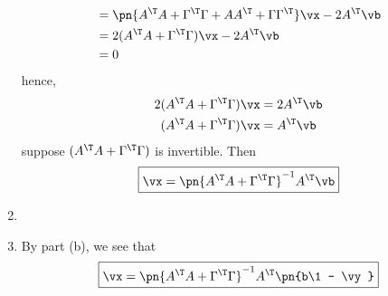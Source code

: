 \documentclass[189]{pset}
\begin{document}
\begin{enumerate}
\begin{align*}
          &= \pn{A^\T A + \Gamma^\T \Gamma + AA^\T +
            \Gamma\Gamma^\T}\vx - 2A^\T \vb \\
          &= 2(A^\T A + \Gamma^\T \Gamma)\vx - 2A^\T \vb \\
          &= 0
        \end{align*}
        hence,
        \begin{align*}
          2(A^\T A + \Gamma^\T \Gamma)\vx
          &= 2A^\T \vb \\
          (A^\T A + \Gamma^\T \Gamma)\vx
          &= A^\T \vb
        \end{align*}
        suppose $(A^\T A + \Gamma^\T \Gamma)$ is invertible. Then
        \[
          \boxed{\vx = \pn{A^\T A + \Gamma^\T \Gamma}^{-1} A^\T \vb}
        \]
      \item
      \item By part (b), we see that
        \[
          \boxed{\vx = \pn{A^\T A + \Gamma^\T \Gamma}^{-1}A^\T \pn{b\1
              - \vy}}
        \]
    \end{enumerate}
\end{document}
